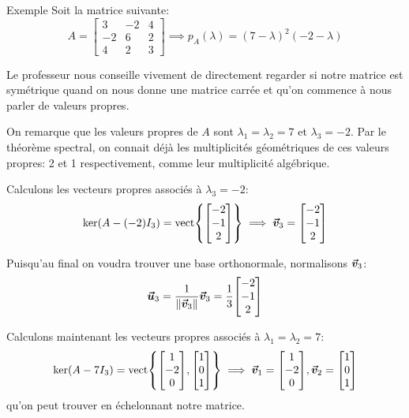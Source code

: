 \documentclass[a4paper]{article}
\begin{document}
\begin{parag}{Exemple}
    Soit la matrice suivante:
    \[A = \begin{bmatrix} 3 & -2 & 4 \\ -2 & 6 & 2 \\ 4 & 2 & 3 \end{bmatrix} \implies p_A\left(\lambda\right) = \left(7 - \lambda\right)^2\left(-2 - \lambda\right)\]

    Le professeur nous conseille vivement de directement regarder si notre matrice est symétrique quand on nous donne une matrice carrée et qu'on commence à nous parler de valeurs propres.

    On remarque que les valeurs propres de $A$ sont $\lambda_1 = \lambda_2 = 7$ et $\lambda_3 = -2$. Par le théorème spectral, on connait déjà les multiplicités géométriques de ces valeurs propres: 2 et 1 respectivement, comme leur multiplicité algébrique.

    Calculons les vecteurs propres associés à $\lambda_3 = -2$:
    \[\ker\left(A - \left(-2\right)I_3\right) = \vect\left\{\begin{bmatrix} -2 \\ -1 \\ 2 \end{bmatrix} \right\} \implies \bvec{v}_3 = \begin{bmatrix} -2 \\ -1 \\ 2 \end{bmatrix} \]

    Puisqu'au final on voudra trouver une base orthonormale, normalisons $\bm{\protect\vec{v}}_3$:
    \[\bvec{u}_3 = \frac{1}{\left\|\bvec{v}_3\right\|} \bvec{v}_3 = \frac{1}{3} \begin{bmatrix} -2 \\ -1 \\ 2 \end{bmatrix} \]

    Calculons maintenant les vecteurs propres associés à $\lambda_1 = \lambda_2 = 7$:
    \[\ker\left(A - 7I_3\right) = \vect\left\{\begin{bmatrix} 1 \\ -2 \\ 0 \end{bmatrix}, \begin{bmatrix} 1 \\ 0 \\ 1 \end{bmatrix} \right\} \implies \bvec{v}_1 = \begin{bmatrix} 1 \\ -2 \\ 0 \end{bmatrix}, \bvec{v}_2 = \begin{bmatrix} 1 \\ 0 \\ 1 \end{bmatrix} \]
    qu'on peut trouver en échelonnant notre matrice.


\end{parag}
\end{document}
